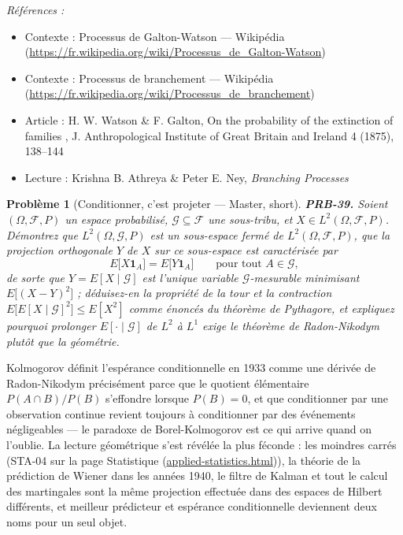 \documentclass[11pt]{article}
\newtheorem{problem}{Problème}
\newenvironment{refs}{\par\small\noindent\emph{Références :}\begin{itemize}\setlength\itemsep{0pt}}{\end{itemize}\normalsize}
\begin{document}
\begin{refs}
\item Contexte : Processus de Galton-Watson --- Wikipédia (\url{https://fr.wikipedia.org/wiki/Processus_de_Galton-Watson})
\item Contexte : Processus de branchement --- Wikipédia (\url{https://fr.wikipedia.org/wiki/Processus_de_branchement})
\item Article : H. W. Watson \& F. Galton, \og{} On the probability of the extinction of families \fg{}, J. Anthropological Institute of Great Britain and Ireland 4 (1875), 138--144
\item Lecture : Krishna B. Athreya \& Peter E. Ney, \textit{Branching Processes}
\end{refs}

\bigskip

\begin{problem}[{Conditionner, c'est projeter --- Master, short}]
\textbf{PRB-39.} Soient $ (\Omega, \mathcal{F}, P) $ un espace probabilisé,
$ \mathcal{G} \subseteq \mathcal{F} $ une sous-tribu, et
$ X \in L^2(\Omega, \mathcal{F}, P) $. Démontrez que $ L^2(\Omega, \mathcal{G}, P) $ est un
sous-espace fermé de $ L^2(\Omega, \mathcal{F}, P) $, que la projection orthogonale $ Y $ de
$ X $ sur ce sous-espace est caractérisée par
\[ E\big[ X \mathbf{1}_A \big] = E\big[ Y \mathbf{1}_A \big] \qquad \text{pour tout } A \in \mathcal{G}, \]
de sorte que $ Y = E[X \mid \mathcal{G}] $ est l'unique variable $ \mathcal{G} $-mesurable
minimisant $ E\big[(X - Y)^2\big] $ ; déduisez-en la propriété de la tour et la contraction
$ E\big[ E[X\mid\mathcal{G}]^2 \big] \le E[X^2] $ comme énoncés du théorème de Pythagore, et
expliquez pourquoi prolonger $ E[\cdot \mid \mathcal{G}] $ de $ L^2 $ à $ L^1 $ exige le
théorème de Radon-Nikodym plutôt que la géométrie.
\end{problem}

\noindent Kolmogorov définit l'espérance conditionnelle en 1933 comme une dérivée de
Radon-Nikodym précisément parce que le quotient élémentaire $ P(A \cap B)/P(B) $ s'effondre
lorsque $ P(B) = 0 $, et que conditionner par une observation continue revient toujours à
conditionner par des événements négligeables --- le paradoxe de Borel-Kolmogorov est ce qui arrive
quand on l'oublie. La lecture géométrique s'est révélée la plus féconde : les moindres carrés
(STA-04 sur la page Statistique (\url{applied-statistics.html})), la théorie de la prédiction
de Wiener dans les années 1940, le filtre de Kalman et tout le calcul des martingales sont la même
projection effectuée dans des espaces de Hilbert différents, et \og{} meilleur prédicteur \fg{} et
\og{} espérance conditionnelle \fg{} deviennent deux noms pour un seul objet.
\end{document}
